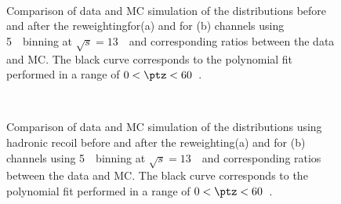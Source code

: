 \begin{figure}[h]
\centering
{}
\\
\caption{Comparison of data and MC simulation of the \ptz distributions before and after the reweightingfor\Zee (a) and for \Zmm (b) channels using 5~\GeV\ binning at $\sqrt{s} = 13$~\TeV\ and corresponding ratios between the data and MC. The black curve corresponds to the polynomial fit performed in a range of $0<\ptz<60$~\GeV. }
\label{fig:fits_pt_13_5GeV}
\end{figure}
\begin{figure}[h]
\centering
{}
\\
\caption{Comparison of data and MC simulation of the \ptz distributions using hadronic recoil before and after the reweighting\Zee (a) and for \Zmm (b) channels using 5~\GeV\ binning at $\sqrt{s} = 13$~\TeV\ and corresponding ratios between the data and MC. The black curve corresponds to the polynomial fit performed in a range of $0<\ptz<60$~\GeV. }
\label{fig:fits_ut_13_5GeV}
\end{figure}

\clearpage
